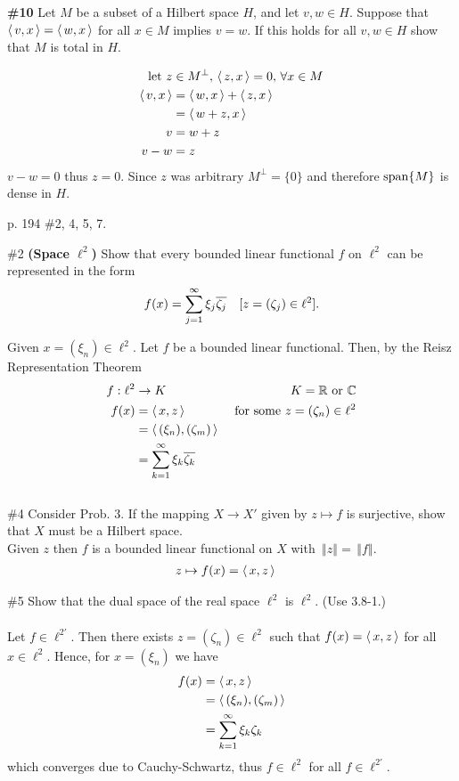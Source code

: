 \documentclass[10pt,a4paper]{report}
\newcommand{\NORM}[1]{\,\left \Vert #1 \right \Vert}
\begin{document}
\noindent \textbf{\#10}  Let $M$ be a subset of a Hilbert space $H$, and let $v,w \in H$.  Suppose that $\left \langle\, v,x \,\right \rangle=\left \langle\, w,x \,\right \rangle$ for all $x \in M$ implies $v=w$.  If this holds for all $v,w \in H$ show that $M$ is total in $H$.

\begin{align*}
	\text{let } z &\in M^\perp, \, \left \langle\,  z, x \,\right \rangle = 0, \,  \forall x \in M\\
	\left \langle\, v,x \,\right \rangle &= \left \langle\, w,x \,\right \rangle + \left \langle\, z,x \,\right \rangle \\
	&= \left \langle\, w+z, x \,\right \rangle\\
	v &= w+z \\
	v-w &= z
\end{align*}$v-w = 0$ thus $z=0$.  Since $z$ was arbitrary $M^\perp = \{0\}$ and therefore $\operatorname{span}\{M\}$ is dense in $H$.

\newpage
\noindent p. 194 \#2, 4, 5, 7.

\noindent \#2 \textbf{(Space $\ell^2$)} Show that every bounded linear functional $f$ on $\ell^2$ can be represented in the form
\begin{align*}
	f(x) &= \sum_{j=1}^\infty \xi_j\overline{\zeta_j} & [z=(\zeta_j)\in \ell^2].
\end{align*}

Given $x = (\xi_n) \in \ell^2$. Let $f$ be a bounded linear functional.  Then, by the Reisz Representation Theorem
\begin{align*}
	f: \ell^2 &\to K & K = \mathbb{R} \text{ or } \mathbb{C}\\
	f(x) &= \left \langle\, x,z \,\right \rangle &\text{ for some } z = (\zeta_n) \in \ell^2 \\ 
	&= \left \langle\, (\xi_n),(\zeta_m) \,\right \rangle \\
	&= \sum_{k=1}^\infty \xi_k \overline{\zeta_k}
\end{align*}\\

\noindent \#4 Consider Prob. 3.  If the mapping $X \to X'$ given by $z \mapsto f$ is surjective, show that $X$ must be a Hilbert space.\\

Given $z$ then $f$ is a bounded linear functional on $X$ with $\NORM{z}=\NORM{f}$.
\begin{align*}
	z &\mapsto f(x)=\left \langle\, x,z \,\right \rangle
\end{align*}

\noindent \#5 Show that the dual space of the real space $\ell^2$ is $\ell^2$. (Use 3.8-1.)\\
\\
Let $f \in \ell^{2'}$.  Then there exists $z = (\zeta_n) \in \ell^2$ such that $f(x) = \left \langle\, x,z \,\right \rangle$ for all $x \in \ell^2$.  Hence, for $x=(\xi_n)$ we have
\begin{align*}
	f(x) &= \left \langle\, x,z \,\right \rangle \\
	&= \left \langle\, (\xi_n),(\zeta_m) \,\right \rangle \\
	&= \sum_{k=1}^\infty \xi_k \zeta_k 
\end{align*}which converges due to Cauchy-Schwartz, thus $f \in \ell^2$ for all $f \in \ell^{2'}$.
\\
\\
\end{document}
